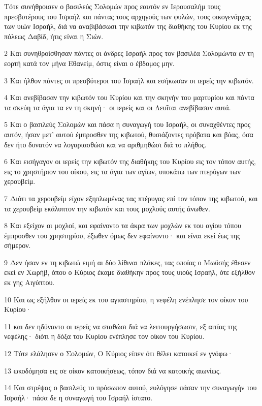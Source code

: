 \par Τότε συνήθροισεν ο βασιλεύς Σολομών προς εαυτόν εν Ιερουσαλήμ τους πρεσβυτέρους του Ισραήλ και πάντας τους αρχηγούς των φυλών, τους οικογενάρχας των υιών Ισραήλ, διά να αναβιβάσωσι την κιβωτόν της διαθήκης του Κυρίου εκ της πόλεως Δαβίδ, ήτις είναι η Σιών.
\par 2 Και συνηθροίσθησαν πάντες οι άνδρες Ισραήλ προς τον βασιλέα Σολομώντα εν τη εορτή κατά τον μήνα Εθανείμ, όστις είναι ο έβδομος μην.
\par 3 Και ήλθον πάντες οι πρεσβύτεροι του Ισραήλ και εσήκωσαν οι ιερείς την κιβωτόν.
\par 4 Και ανεβίβασαν την κιβωτόν του Κυρίου και την σκηνήν του μαρτυρίου και πάντα τα σκεύη τα άγια τα εν τη σκηνή· οι ιερείς και οι Λευΐται ανεβίβασαν αυτά.
\par 5 Και ο βασιλεύς Σολομών και πάσα η συναγωγή του Ισραήλ, οι συναχθέντες προς αυτόν, ήσαν μετ' αυτού έμπροσθεν της κιβωτού, θυσιάζοντες πρόβατα και βόας, όσα δεν ήτο δυνατόν να λογαριασθώσι και να αριθμηθώσι διά το πλήθος.
\par 6 Και εισήγαγον οι ιερείς την κιβωτόν της διαθήκης του Κυρίου εις τον τόπον αυτής, εις το χρηστήριον του οίκου, εις τα άγια των αγίων, υποκάτω των πτερύγων των χερουβείμ.
\par 7 Διότι τα χερουβείμ είχον εξηπλωμένας τας πτέρυγας επί τον τόπον της κιβωτού, και τα χερουβείμ εκάλυπτον την κιβωτόν και τους μοχλούς αυτής άνωθεν.
\par 8 Και εξείχον οι μοχλοί, και εφαίνοντο τα άκρα των μοχλών εκ του αγίου τόπου έμπροσθεν του χρηστηρίου, έξωθεν όμως δεν εφαίνοντο· και είναι εκεί έως της σήμερον.
\par 9 Δεν ήσαν εν τη κιβωτώ ειμή αι δύο λίθιναι πλάκες, τας οποίας ο Μωϋσής έθεσεν εκεί εν Χωρήβ, όπου ο Κύριος έκαμε διαθήκην προς τους υιούς Ισραήλ, ότε εξήλθον εκ γης Αιγύπτου.
\par 10 Και ως εξήλθον οι ιερείς εκ του αγιαστηρίου, η νεφέλη ενέπλησε τον οίκον του Κυρίου·
\par 11 και δεν ηδύναντο οι ιερείς να σταθώσι διά να λειτουργήσωσιν, εξ αιτίας της νεφέλης· διότι η δόξα του Κυρίου ενέπλησε τον οίκον του Κυρίου.
\par 12 Τότε ελάλησεν ο Σολομών, Ο Κύριος είπεν ότι θέλει κατοικεί εν γνόφω·
\par 13 ωκοδόμησα εις σε οίκον κατοικήσεως, τόπον διά να κατοικής αιωνίως.
\par 14 Και στρέψας ο βασιλεύς το πρόσωπον αυτού, ευλόγησε πάσαν την συναγωγήν του Ισραήλ· πάσα δε η συναγωγή του Ισραήλ ίστατο.
